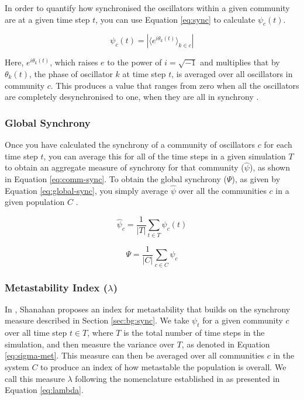 \documentclass[a4paper,11pt]{article}
\begin{document}
In order to quantify how synchronised the oscillators within a given community are at a given time step $t$, you can use Equation \ref{eq:sync} to calculate $\psi_c(t)$\cite{Shanahan2010}. 

\begin{equation} \label{eq:sync}
\psi_c(t) = |\langle e^{i\theta_k(t)}\rangle_{k \in c}|
\end{equation}

Here, $e^{i\theta_k(t)}$, which raises $e$ to the power of $i = \sqrt{-1}$ and multiplies that by $\theta_k(t)$, the phase of oscillator $k$ at time step $t$, is averaged over all oscillators in community $c$. This produces a value that ranges from zero when all the oscillators are completely desynchronised to one, when they are all in synchrony \cite{Shanahan2010}.

\subsubsection{Global Synchrony}
\label{sec:bg:global-sync}

Once you have calculated the synchrony of a community of oscillators $c$ for each time step $t$, you can average this for all of the time steps in a given simulation $T$ to obtain an aggregate measure of synchrony for that community ($\widehat{\psi}$), as shown in Equation \ref{eq:comm-sync}.  To obtain the global synchrony ($\Psi$), as given by Equation \ref{eq:global-sync}, you simply average $\widehat{\psi}$ over all the communities $c$ in a given population $C$ \cite{Shanahan2010}.

\begin{equation} \label{eq:comm-sync}
\widehat{\psi}_c = \frac{1}{|T|} \sum_{t \in T} \psi_c(t)
\end{equation}

\begin{equation} \label{eq:global-sync}
\Psi = \frac{1}{|C|} \sum_{c \in C} \widehat{\psi}_c
\end{equation}
 
\subsubsection{Metastability Index ($\lambda$)}
\label{sec:bg:lambda}

In \cite{Shanahan2010}, Shanahan proposes an index for metastability that builds on the synchrony measure described in Section \ref{sec:bg:sync}. We take $\psi_t$ for a given community $c$ over all time step $t \in T$, where $T$ is the total number of time steps in the simulation, and then measure the variance over $T$, as denoted in Equation \ref{eq:sigma-met}. This measure can then be averaged over all communities $c$ in the system $C$ to produce an index of how metastable the population is overall. We call this measure $\lambda$ following the nomenclature established in \cite{Shanahan2010} as presented in Equation \ref{eq:lambda}.
\end{document}

